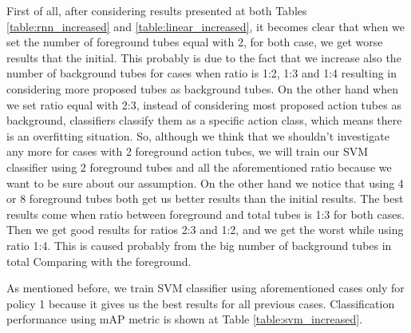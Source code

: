 \documentclass{report}
\begin{document}
First of all, after considering results presented at both Tables \ref{table:rnn_increased} and \ref{table:linear_increased}, it becomes clear that when we
set the number of foreground tubes equal with 2, for both case, we get worse results that the initial. This probably is due to the fact that we increase
also the number of background tubes for cases when ratio is 1:2, 1:3 and 1:4 resulting in considering more proposed tubes as background tubes. On the other
hand when we set ratio equal with 2:3, instead of considering most proposed action tubes as background, classifiers classify them as a specific action class,
which means there is an overfitting situation. So, although we think that we shouldn't investigate any more for cases with 2 foreground action tubes,
we will train our SVM classifier using 2 foreground tubes and all the aforementioned ratio because we want to be sure about our assumption. On the other hand
we notice that using 4 or 8 foreground tubes both  get us better results than the initial results. The best results come when  ratio between foreground and
total tubes is 1:3 for both cases. Then we get good results for ratios 2:3 and 1:2, and we get the worst while using ratio 1:4. This is caused probably
from the big number of background tubes in total Comparing with the foreground. \par 
As mentioned before, we train SVM classifier using aforementioned cases only for policy 1 because it gives us the best results for all previous cases.
Classification performance using mAP metric is shown at Table \ref{table:svm_increased}. 
\end{document}
